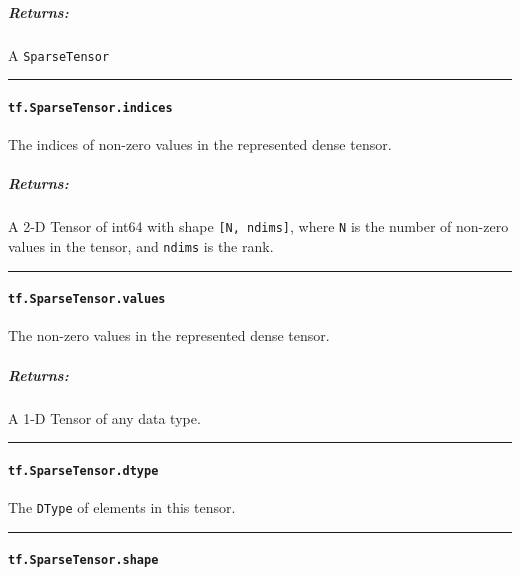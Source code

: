\subparagraph{Returns: }\label{returns}

A \texttt{SparseTensor}

\begin{center}\rule{0.5\linewidth}{\linethickness}\end{center}

\paragraph{\texorpdfstring{\texttt{tf.SparseTensor.indices}
}{tf.SparseTensor.indices }}\label{tf.sparsetensor.indices}

The indices of non-zero values in the represented dense tensor.

\subparagraph{Returns: }\label{returns-1}

A 2-D Tensor of int64 with shape \texttt{{[}N,\ ndims{]}}, where
\texttt{N} is the number of non-zero values in the tensor, and
\texttt{ndims} is the rank.

\begin{center}\rule{0.5\linewidth}{\linethickness}\end{center}

\paragraph{\texorpdfstring{\texttt{tf.SparseTensor.values}
}{tf.SparseTensor.values }}\label{tf.sparsetensor.values}

The non-zero values in the represented dense tensor.

\subparagraph{Returns: }\label{returns-2}

A 1-D Tensor of any data type.

\begin{center}\rule{0.5\linewidth}{\linethickness}\end{center}

\paragraph{\texorpdfstring{\texttt{tf.SparseTensor.dtype}
}{tf.SparseTensor.dtype }}\label{tf.sparsetensor.dtype}

The \texttt{DType} of elements in this tensor.

\begin{center}\rule{0.5\linewidth}{\linethickness}\end{center}

\paragraph{\texorpdfstring{\texttt{tf.SparseTensor.shape}
}{tf.SparseTensor.shape }}\label{tf.sparsetensor.shape}

